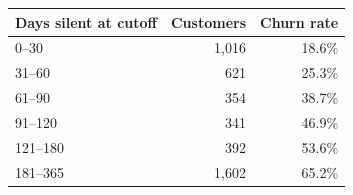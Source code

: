 \begin{tabular}{lrr}
\toprule
Days silent at cutoff & Customers & Churn rate \\
\midrule
0--30 & 1,016 & 18.6\% \\
31--60 & 621 & 25.3\% \\
61--90 & 354 & 38.7\% \\
91--120 & 341 & 46.9\% \\
121--180 & 392 & 53.6\% \\
181--365 & 1,602 & 65.2\% \\
\bottomrule
\end{tabular}
